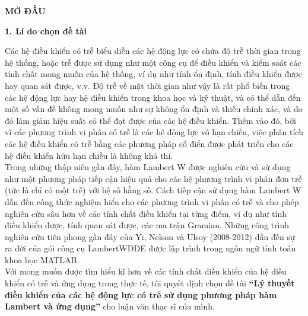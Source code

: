 \newpage
{}
\begin{center}
\textbf{\textbf {MỞ ĐẦU}}
\end{center}
\noindent \textbf{1. Lí do chọn đề tài}

Các hệ điều khiển có trễ biểu diễn các hệ động lực có chứa độ trễ thời gian trong
hệ thống, hoặc trễ được sử dụng như một công cụ để điều khiển và kiểm soát các
tính chất mong muốn của hệ thống, ví dụ như tính ổn định, tính điều khiển được
hay quan sát được, v.v. Độ trễ về mặt thời gian như vậy là rất phổ biến trong các hệ
động lực hay hệ điều khiển trong khoa học và kỹ thuật, và có thể dẫn đến một số
vấn đề không mong muốn như sự không ổn định và thiếu chính xác, và do đó làm giảm hiệu suất có thể đạt được của các hệ điều khiển. Thêm vào đó, bởi
vì các phương trình vi phân có trễ là các hệ động lực vô hạn chiều, việc phân tích
các hệ điều khiển có trễ bằng các phương pháp cổ điển được phát triển cho các hệ
điều khiển hữu hạn chiều là không khả thi.\\
Trong những thập niên gần đây, hàm Lambert W được nghiên cứu và sử
dụng như một phương pháp tiếp cận hiệu quả cho các hệ phương trình vi phân
đơn trễ (tức là chỉ có một trễ) với hệ số hằng số. Cách tiếp cận sử dụng hàm Lambert W dẫn đến công thức nghiệm hiển cho các phương trình vi phân có trễ và
cho phép nghiên cứu sâu hơn về các tính chất điều khiển tại từng điểm, ví dụ như
tính điều khiển được, tính quan sát được, các ma trận Gramian. Những công trình
nghiên cứu tiên phong gần đây của Yi, Nelson và Ulsoy (2008-2012) dẫn đến sự ra
đời của gói công cụ LambertWDDE được lập trình trong ngôn ngữ tính toán khoa học
MATLAB.\\
Với mong muốn được tìm hiểu kĩ hơn về các tính chất điều khiển của hệ điều
khiển có trễ và ứng dụng trong thực tế, tôi quyết định chọn đề tài \textbf{“Lý thuyết điều
khiển của các hệ động lực có trễ sử dụng phương pháp hàm Lambert và ứng dụng”}
cho luận văn thạc sĩ của mình.

